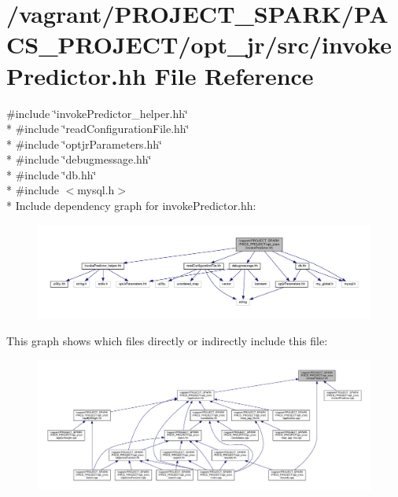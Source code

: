 \hypertarget{invokePredictor_8hh}{\section{/vagrant/\-P\-R\-O\-J\-E\-C\-T\-\_\-\-S\-P\-A\-R\-K/\-P\-A\-C\-S\-\_\-\-P\-R\-O\-J\-E\-C\-T/opt\-\_\-jr/src/invoke\-Predictor.hh File Reference}
\label{invokePredictor_8hh}
}
{\ttfamily \#include \char`\"{}invoke\-Predictor\-\_\-helper.\-hh\char`\"{}}\\*
{\ttfamily \#include \char`\"{}read\-Configuration\-File.\-hh\char`\"{}}\\*
{\ttfamily \#include \char`\"{}optjr\-Parameters.\-hh\char`\"{}}\\*
{\ttfamily \#include \char`\"{}debugmessage.\-hh\char`\"{}}\\*
{\ttfamily \#include \char`\"{}db.\-hh\char`\"{}}\\*
{\ttfamily \#include $<$mysql.\-h$>$}\\*
Include dependency graph for invoke\-Predictor.\-hh\-:\nopagebreak
\begin{figure}[H]
\begin{center}
\leavevmode
\includegraphics[width=350pt]{invokePredictor_8hh__incl}
\end{center}
\end{figure}
This graph shows which files directly or indirectly include this file\-:\nopagebreak
\begin{figure}[H]
\begin{center}
\leavevmode
\includegraphics[width=350pt]{invokePredictor_8hh__dep__incl}
\end{center}
\end{figure}
